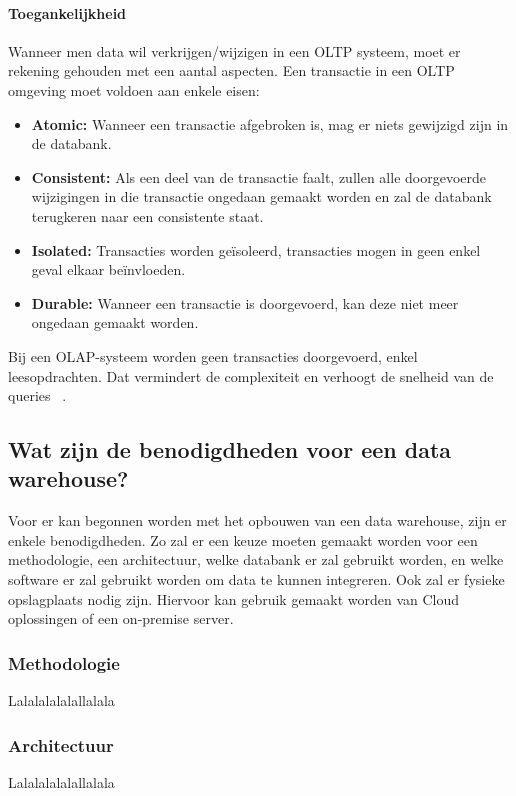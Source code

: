 \paragraph{Toegankelijkheid}
Wanneer men data wil verkrijgen/wijzigen in een OLTP systeem, moet er rekening gehouden met een aantal aspecten. Een transactie in een OLTP omgeving moet voldoen aan enkele eisen:
\begin{itemize}
	\item \textbf{Atomic:} Wanneer een transactie afgebroken is, mag er niets gewijzigd zijn in de databank.
	\item \textbf{Consistent:} Als een deel van de transactie faalt, zullen alle doorgevoerde wijzigingen in die transactie ongedaan gemaakt worden en zal de databank terugkeren naar een consistente staat.
	\item \textbf{Isolated:} Transacties worden geïsoleerd, transacties mogen in geen enkel geval elkaar beïnvloeden.
	\item \textbf{Durable:} Wanneer een transactie is doorgevoerd, kan deze niet meer ongedaan gemaakt worden.
\end{itemize}  

Bij een OLAP-systeem worden geen transacties doorgevoerd, enkel leesopdrachten. Dat vermindert de complexiteit en verhoogt de snelheid van de queries ~\autocite{Satyanarayana2010}. 

\subsection{Wat zijn de benodigdheden voor een data warehouse?}
Voor er kan begonnen worden met het opbouwen van een data warehouse, zijn er enkele benodigdheden. Zo zal er een keuze moeten gemaakt worden voor een methodologie, een architectuur, welke databank er zal gebruikt worden, en welke software er zal gebruikt worden om data te kunnen integreren. Ook zal er fysieke opslagplaats nodig zijn. Hiervoor kan gebruik gemaakt worden van Cloud oplossingen of een on-premise server.

\subsubsection{Methodologie}
Lalalalalalallalala

\subsubsection{Architectuur}
Lalalalalalallalala

